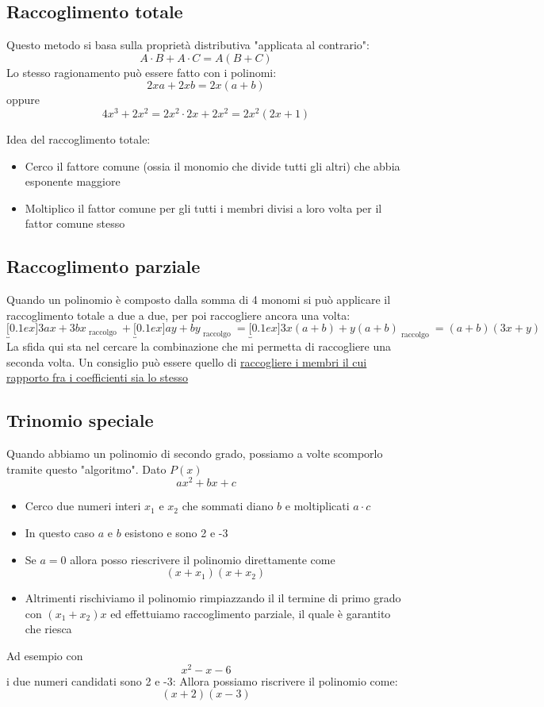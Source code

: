 \subsection{Raccoglimento totale}
Questo metodo si basa sulla proprietà distributiva "applicata al contrario":
\[
	A \cdot B + A \cdot C = A\left(B + C\right)
\]
Lo stesso ragionamento può essere fatto con i polinomi:
\[
	2x a + 2x b = 2x \left(a + b\right)
\]
oppure
\[
	4x^3  + 2x^2  = 2x^2  \cdot 2x + 2x^2  = 2x^2  \left(2x +1\right)
\]
\begin{tcolorbox}
	Idea del raccoglimento totale:
	\begin{itemize}
		\item Cerco il fattore comune (ossia il monomio che divide tutti gli altri) che abbia esponente maggiore
		\item Moltiplico il fattor comune per gli tutti i membri divisi a loro volta per il fattor comune stesso
	\end{itemize}
\end{tcolorbox}

\subsection{Raccoglimento parziale}
Quando un polinomio è composto dalla somma di 4 monomi si può applicare il raccoglimento totale a due a due, per poi raccogliere ancora una volta:
\[
	\underbracket[0.1ex]{3ax + 3bx}_{\text{ raccolgo }} + \underbracket[0.1ex]{ay + by}_{\text{ raccolgo }} = \underbracket[0.1ex]{3x\left(a + b\right) + y\left(a + b\right)}_{\text{ raccolgo }} = \left(a+b\right)\left(3x + y\right)
\]
La sfida qui sta nel cercare la combinazione che mi permetta di raccogliere una seconda volta. Un consiglio può essere quello di \underline{raccogliere i membri il cui rapporto fra i coefficienti sia lo stesso}

\subsection{Trinomio speciale}
Quando abbiamo un polinomio di secondo grado, possiamo a volte scomporlo tramite questo "algoritmo". Dato $ P\left(x\right) $
\[
	ax^2 +bx + c
\]
\begin{itemize}
	\item Cerco due numeri interi $ x_1 $ e $ x_2 $ che sommati diano $ b $ e moltiplicati $ a \cdot c $
	\item In questo caso $ a $ e $ b $ esistono e sono 2 e -3
	\item Se $ a=0 $ allora posso riescrivere il polinomio direttamente come
	      \[
		      \left(x + x_1\right)\left(x + x_2\right)
	      \]
	\item Altrimenti rischiviamo il polinomio rimpiazzando il il termine di primo grado con $ \left(x_1 + x_2\right)x $ ed effettuiamo raccoglimento parziale, il quale è garantito che riesca
\end{itemize}
Ad esempio con
\[
	x^2  -x -6
\]
i due numeri candidati sono 2 e -3: Allora possiamo riscrivere il polinomio come:
\[
	\left(x+2\right) \left(x-3\right)
\]
